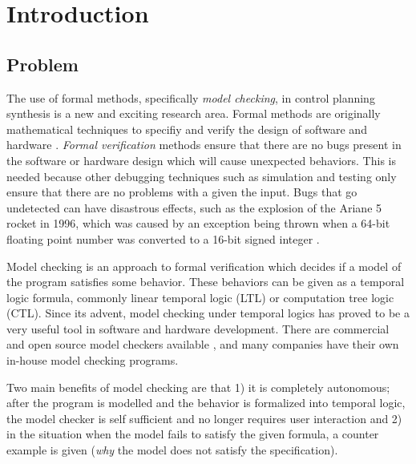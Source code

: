 \chapter{Introduction}
\section{Problem}
The use of formal methods, specifically \textit{model checking}, in control planning synthesis is a new and exciting research area. Formal methods are originally mathematical techniques to specifiy and verify the design of software and hardware \cite{clarke96}. \textit{Formal verification} methods ensure that there are no bugs present in the software or hardware design which will cause unexpected behaviors. This is needed because other debugging techniques such as simulation and testing only ensure that there are no problems with a given the input. Bugs that go undetected can have disastrous effects, such as the explosion of the Ariane 5 rocket in 1996, which was caused by an exception being thrown when a 64-bit floating point number was converted to a 16-bit signed integer \cite{clarke99}. 

Model checking is an approach to formal verification which decides if a model of the program satisfies some behavior. These behaviors can be given as a temporal logic formula, commonly linear temporal logic (LTL) or computation tree logic (CTL). Since its advent, model checking under temporal logics has proved to be a very useful tool in software and hardware development. There are commercial and open source model checkers available \cite{holzmann03}, \cite{cimatti02} and many companies have their own in-house model checking programs. 

Two main benefits of model checking are that 1) it is completely autonomous; after the program is modelled and the behavior is formalized into temporal logic, the model checker is self sufficient and no longer requires user interaction and 2) in the situation when the model fails to satisfy the given formula, a counter example is given (\textit{why} the model does not satisfy the specification). 

